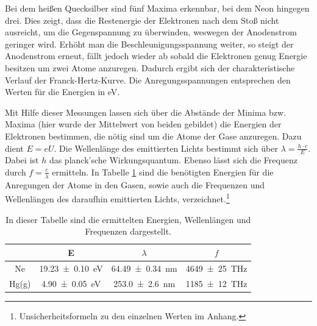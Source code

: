 	Bei dem heißen Quecksilber sind fünf Maxima erkennbar, bei dem Neon hingegen drei.
	Dies zeigt, dass die Restenergie der Elektronen nach dem Stoß nicht ausreicht, um die Gegenspannung zu überwinden, weswegen der Anodenstrom geringer wird.
	Erhöht man die Beschleunigungsspannung weiter, so steigt der Anodenstrom erneut, fällt jedoch wieder ab sobald die Elektronen genug Energie besitzen um zwei Atome anzuregen.
	Dadurch ergibt sich der charakteristische Verlauf der Franck-Hertz-Kurve.
	Die Anregungsspannungen entsprechen den Werten für die Energien in \si{\electronvolt}.
	 
	Mit Hilfe dieser Messungen lassen sich über die Abstände der Minima bzw. Maxima (hier wurde der Mittelwert von beiden gebildet) die Energien der Elektronen bestimmen, die nötig sind um die Atome der Gase anzuregen.
	Dazu dient $E=eU$. 
	Die Wellenlänge des emittierten Lichts bestimmt sich über $\lambda = \frac{h \cdot c}{E}$.
	Dabei ist $h$ das planck'sche Wirkungsquantum.
	Ebenso lässt sich die Frequenz durch $f = \frac{c}{\lambda}$ ermitteln. 
	In Tabelle \ref{tab:Werte} sind die benötigten Energien für die Anregungen der Atome in den Gasen, sowie auch die Frequenzen und Wellenlängen des daraufhin emittierten Lichts, verzeichnet.\footnote{Unsicherheitsformeln zu den einzelnen Werten im Anhang.}
	\begin{table}
		\caption{In dieser Tabelle sind die ermittelten Energien, Wellenlängen und Frequenzen dargestellt.}
		\label{tab:Werte}
		\centering
		\begin{tabular}{c|c|c|c}
			& E & $\lambda$ & $f$ \\			
			\hline		
			Ne & \SI{19.23+-0.10}{\electronvolt} & \SI{64.49+-0.34}{\nano\meter} & \SI{4649+-25}{\tera\hertz} \\
			Hg(g) & \SI{4.90+-0.05}{\electronvolt} & \SI{253.0+-2.6}{\nano\meter} & \SI{1185+-12}{\tera\hertz} \\				
		\end{tabular}
	\end{table}

